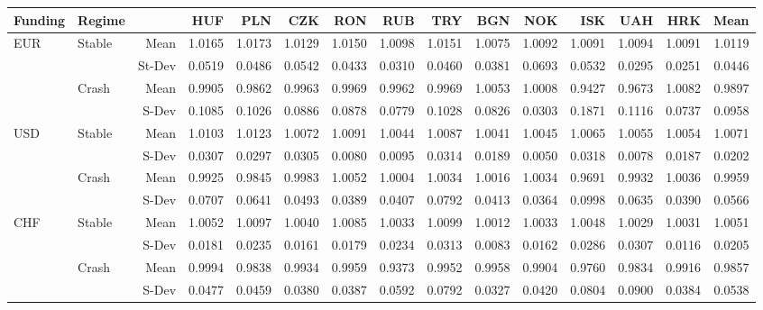 \documentclass[12pt, a4paper, oneside]{article}\usepackage[]{graphicx}\usepackage[]{color}
\begin{document}
\begin{landscape}
\begin{table}[ht]
\begin{threeparttable}
\centering
\begin{tabular}{llrrrrrrrrrrrrr}
  \hline
 Funding & Regime& & HUF & PLN & CZK & RON & RUB & TRY & BGN & NOK & ISK & UAH & HRK & Mean \\ 
  \hline
  \hline
\multirow{4}{*}{EUR}& \multirow{2}{*}{Stable}& Mean & 1.0165 & 1.0173 & 1.0129 & 1.0150 & 1.0098 & 1.0151 & 1.0075 & 1.0092 & 1.0091 & 1.0094 & 1.0091 & 1.0119 \\ 
&&St-Dev& 0.0519 & 0.0486 & 0.0542 & 0.0433 & 0.0310 & 0.0460 & 0.0381 & 0.0693 & 0.0532 & 0.0295 & 0.0251 & 0.0446 \\ 
&\multirow{2}{*}{Crash}& Mean & 0.9905 & 0.9862 & 0.9963 & 0.9969 & 0.9962 & 0.9969 & 1.0053 & 1.0008 & 0.9427 & 0.9673 & 1.0082 & 0.9897 \\ 
 &&S-Dev & 0.1085 & 0.1026 & 0.0886 & 0.0878 & 0.0779 & 0.1028 & 0.0826 & 0.0303 & 0.1871 & 0.1116 & 0.0737 & 0.0958 \\ 
\hline
\multirow{4}{*}{USD}&\multirow{2}{*}{Stable}&Mean& 1.0103 & 1.0123 & 1.0072 & 1.0091 & 1.0044 & 1.0087 & 1.0041 & 1.0045 & 1.0065 & 1.0055 & 1.0054 & 1.0071 \\ 
&&S-Dev& 0.0307 & 0.0297 & 0.0305 & 0.0080 & 0.0095 & 0.0314 & 0.0189 & 0.0050 & 0.0318 & 0.0078 & 0.0187 & 0.0202 \\ 
  &\multirow{2}{*}{Crash}&Mean& 0.9925 & 0.9845 & 0.9983 & 1.0052 & 1.0004 & 1.0034 & 1.0016 & 1.0034 & 0.9691 & 0.9932 & 1.0036 & 0.9959 \\ 
   & & S-Dev & 0.0707 & 0.0641 & 0.0493 & 0.0389 & 0.0407 & 0.0792 & 0.0413 & 0.0364 & 0.0998 & 0.0635 & 0.0390 & 0.0566 \\ 
\hline
\multirow{4}{*}{CHF}& \multirow{2}{*}{Stable}&Mean& 1.0052 & 1.0097 & 1.0040 & 1.0085 & 1.0033 & 1.0099 & 1.0012 & 1.0033 & 1.0048 & 1.0029 & 1.0031 & 1.0051 \\ 
   & & S-Dev & 0.0181 & 0.0235 & 0.0161 & 0.0179 & 0.0234 & 0.0313 & 0.0083 & 0.0162 & 0.0286 & 0.0307 & 0.0116 & 0.0205 \\ 
   & \multirow{2}{*}{Crash}& Mean & 0.9994 & 0.9838 & 0.9934 & 0.9959 & 0.9373 & 0.9952 & 0.9958 & 0.9904 & 0.9760 & 0.9834 & 0.9916 & 0.9857 \\ 
  & & S-Dev & 0.0477 & 0.0459 & 0.0380 & 0.0387 & 0.0592 & 0.0792 & 0.0327 & 0.0420 & 0.0804 & 0.0900 & 0.0384 & 0.0538 \\ 

\end{tabular}
\end{threeparttable}
\end{table}
\end{landscape}
\end{document}
